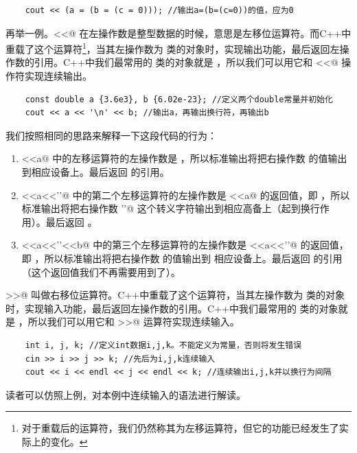 \begin{lstlisting}
    cout << (a = (b = (c = 0))); //输出a=(b=(c=0))的值，应为0
\end{lstlisting}\par
再举一例。\lstinline@<<@ 在左操作数是整型数据的时候，意思是左移位运算符。而C++中重载了这个运算符\footnote{对于重载后的运算符，我们仍然称其为左移运算符，但它的功能已经发生了实际上的变化。}，当其左操作数为 \lstinline@ostream@ 类的对象时，实现输出功能，最后返回左操作数的引用。C++中我们最常用的 \lstinline@ostream@ 类的对象就是 \lstinline@cout@，所以我们可以用它和 \lstinline@<<@ 操作符实现连续输出。
\begin{lstlisting}
    const double a {3.6e3}, b {6.02e-23}; //定义两个double常量并初始化
    cout << a << '\n' << b; //输出a，再输出换行符，再输出b
\end{lstlisting}
我们按照相同的思路来解释一下这段代码的行为：
\begin{enumerate}
    \item \lstinline@cout<<a@ 中的左移运算符的左操作数是 \lstinline@cout@，所以标准输出将把右操作数 \lstinline@a@ 的值输出到相应设备上。最后返回 \lstinline@cout@ 的引用。
    \item \lstinline@cout<<a<<'\n'@ 中的第二个左移运算符的左操作数是 \lstinline@cout<<a@ 的返回值，即 \lstinline@cout@，所以标准输出将把右操作数 \lstinline@'\n'@ 这个转义字符输出到相应高备上（起到换行作用）。最后返回 。
    \item \lstinline@cout<<a<<'\n'<<b@ 中的第三个左移运算符的左操作数是 \lstinline@cout<<a<<'\n'@ 的返回值，即 \lstinline@cout@，所以标准输出将把右操作数 \lstinline@b@ 的值输出到 相应设备上。最后返回 \lstinline@cout@ 的引用（这个返回值我们不再需要用到了）。
\end{enumerate}\par
\lstinline@>>@ 叫做右移位运算符。C++中重载了这个运算符，当其左操作数为 \lstinline@istream@ 类的对象时，实现输入功能，最后返回左操作数的引用。C++中我们最常用的 \lstinline@istream@ 类的对象就是 \lstinline@cin@，所以我们可以用它和 \lstinline@>>@ 运算符实现连续输入。
\begin{lstlisting}
    int i, j, k; //定义int数据i,j,k。不能定义为常量，否则将发生错误
    cin >> i >> j >> k; //先后为i,j,k连续输入
    cout << i << endl << j << endl << k; //连续输出i,j,k并以换行为间隔
\end{lstlisting}
读者可以仿照上例，对本例中连续输入的语法进行解读。\par
